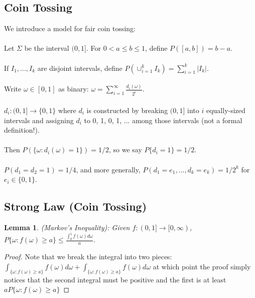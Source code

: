\documentclass[12pt]{article}
\newtheorem{lemma}{Lemma}
\begin{document}
\subsection{Coin Tossing}
We introduce a model for fair coin tossing:
\\ \\
Let $\Sigma$ be the interval $(0, 1]$.  For $0 < a \le b \le 1$, define $P([a,b]) = b-a$.
\\ \\
If $I_1, ..., I_k$ are disjoint intervals, define $P(\cup_{i=1}^k I_k) = \sum_{i=1}^k |I_k|$.
\\ \\
Write $\omega \in [0,1]$ as binary: $\omega = \sum_{i=1}^\infty \frac{d_i(\omega)}{2^i}$.
\\ \\
$d_i: (0,1] \rightarrow \{0, 1\}$ where $d_i$ is constructed by breaking $(0, 1]$ into $i$ equally-sized intervals and assigning $d_i$ to 0, 1, 0, 1, ... among those intervals (not a formal definition!).
\\ \\
Then $P(\{ \omega: d_i(\omega) = 1\}) = 1/2$, so we say $P\{d_i = 1\} = 1/2$.
\\ \\
$P(d_1 = d_2 = 1) = 1/4$, and more generally, $P(d_1 = e_1, ..., d_k = e_k) = 1/2^k$ for $e_i \in \{0, 1\}$.

\subsection{Strong Law (Coin Tossing)}
\begin{lemma}
(Markov's Inequality): Given $f:(0, 1] \rightarrow [0, \infty)$, $P\{\omega: f(\omega) \ge a\} \le \frac{ \int_0^1 f(\omega) d \omega }{a}$.
\end{lemma}
\begin{proof}
Note that we break the integral into two pieces: $\int_{\{ \omega : f(\omega) \ge a \}} f(\omega) d\omega +\int_{\{ \omega : f(\omega) \ge a \}} f(\omega) d\omega$ at which point the proof simply notices that the second integral must be positive and the first is at least $a P\{ \omega : f(\omega) \ge a \}$
\end{proof}
\end{document}
